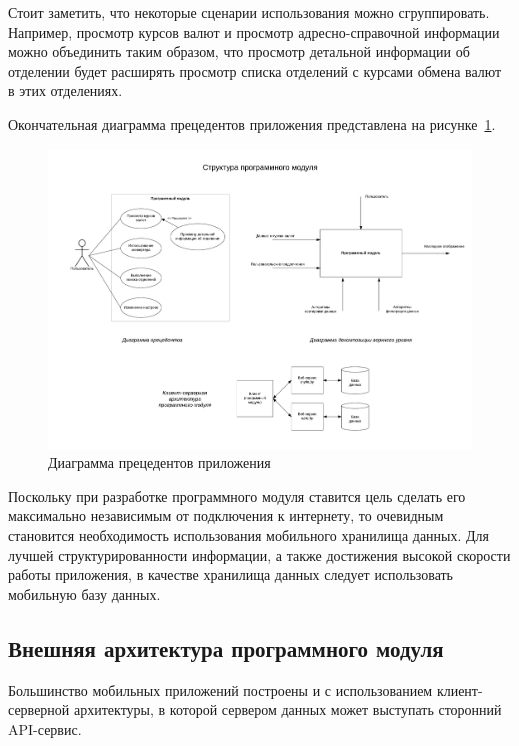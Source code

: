 Стоит заметить, что некоторые сценарии использования можно сгруппировать.
Например, просмотр курсов валют и просмотр адресно-справочной информации можно
объединить таким образом, что просмотр детальной информации об отделении будет
расширять просмотр списка отделений с курсами обмена валют в этих отделениях.

Окончательная диаграмма прецедентов приложения
представлена на рисунке~\ref{fig:use_case}.
\begin{figure}[h!]
  \centering
  \includegraphics[width=140mm]{fig/use_case}
  \caption{Диаграмма прецедентов приложения}
  \label{fig:use_case}
\end{figure}

Поскольку при разработке программного модуля ставится цель сделать его
максимально независимым от подключения к интернету, то очевидным становится
необходимость использования мобильного хранилища данных. Для лучшей
структурированности информации, а также достижения высокой скорости работы приложения,
в качестве хранилища данных следует использовать мобильную базу данных.

\pagebreak



\subsection{Внешняя архитектура программного модуля}

Большинство мобильных приложений построены и с использованием клиент-серверной
архитектуры, в которой сервером данных может выступать сторонний API-сервис.

